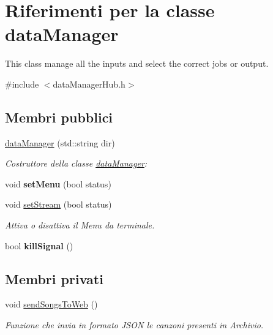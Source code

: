 \hypertarget{classdataManager}{\section{\-Riferimenti per la classe data\-Manager}
\label{classdataManager}
}


\-This class manage all the inputs and select the correct jobs or output.  




{\ttfamily \#include $<$data\-Manager\-Hub.\-h$>$}

\subsection*{\-Membri pubblici}
\begin{DoxyCompactItemize}
\item 
\hyperlink{classdataManager_a53882fb8b2d08f1b73f6c8e9202c5ae4}{data\-Manager} (std\-::string dir)
\begin{DoxyCompactList}\small\item\em \-Costruttore della classe \hyperlink{classdataManager}{data\-Manager}\-: \end{DoxyCompactList}\item 
\hypertarget{classdataManager_a98a9361df1cb36f98f6322c78451ef22}{void {\bfseries set\-Menu} (bool status)}\label{classdataManager_a98a9361df1cb36f98f6322c78451ef22}

\item 
void \hyperlink{classdataManager_a454263e6cf2ca50cc53afc8bae0e0e58}{set\-Stream} (bool status)
\begin{DoxyCompactList}\small\item\em \-Attiva o disattiva il \-Menu da terminale. \end{DoxyCompactList}\item 
\hypertarget{classdataManager_a72a7547b38a4683dd762853190d6c442}{bool {\bfseries kill\-Signal} ()}\label{classdataManager_a72a7547b38a4683dd762853190d6c442}

\end{DoxyCompactItemize}
\subsection*{\-Membri privati}
\begin{DoxyCompactItemize}
\item 
\hypertarget{classdataManager_a69df5746c83be0abbb051ba4bd4d96d6}{void \hyperlink{classdataManager_a69df5746c83be0abbb051ba4bd4d96d6}{send\-Songs\-To\-Web} ()}\label{classdataManager_a69df5746c83be0abbb051ba4bd4d96d6}

\begin{DoxyCompactList}\small\item\em \-Funzione che invia in formato \-J\-S\-O\-N le canzoni presenti in \-Archivio. \end{DoxyCompactList}\end{DoxyCompactItemize}
